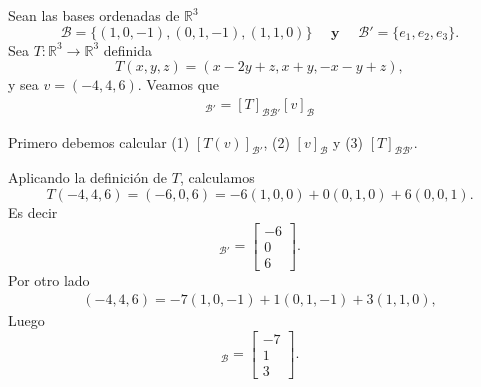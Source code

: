 \documentclass[handout]{beamer} %
\newcommand{\R}{\mathbb R}
\newcommand{\cB}{\mathcal{B}}
\begin{document}
    
    \begin{frame}
        \begin{ejemplo}
            Sean las bases ordenadas de $\R^3$
            $$\cB = \{(1,0,-1),(0,1,-1),(1,1,0)\}\quad \textbf{ y } \quad\cB' = \{e_1,e_2,e_3\}.$$ 
            Sea $T: \R^3 \to \R^3$ definida
            $$
            T(x,y,z) = (x-2y+z, x+y, -x-y+z),
            $$ 
            y sea $v=(-4,4,6)$. Veamos  que 
        \begin{align*}
            [T(v)]_{\cB'}=[T]_{\cB\cB'}[v]_{\cB}
            \end{align*}
        \end{ejemplo}\pause
        \begin{solucion}\pause
            Primero debemos calcular (1) $[T(v)]_{\cB'}$,\; (2) $[v]_{\cB}$\; y \;(3) $[T]_{\cB\cB'}$.
        \end{solucion}	
    \end{frame}
    
    
    \begin{frame}
        Aplicando la definición de $T$, calculamos
        $$
        T(-4,4,6) = (-6,0,6) = -6(1,0,0) +0(0,1,0) + 6(0,0,1).
        $$
        Es decir 
        \begin{equation*}
            [T(v)]_{\cB'} = \begin{bmatrix}
                -6 \\0\\6
            \end{bmatrix}.\tag{1}
        \end{equation*}
        \pause
        Por otro  lado
        \begin{align*}
            (-4,4,6) = -7(1,0,-1) +1(0,1,-1)+3(1,1,0),
        \end{align*}
        Luego
        \begin{equation*}
            [v]_{\cB} = \begin{bmatrix}
                -7 \\1\\3
            \end{bmatrix}.\tag{2}
        \end{equation*}
    \end{frame}
    
\end{document}
